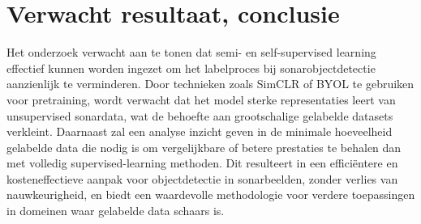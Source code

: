 
\section{Verwacht resultaat, conclusie}%
\label{sec:verwachte_resultaten}

Het onderzoek verwacht aan te tonen dat semi- en self-supervised learning effectief kunnen worden ingezet om het labelproces bij sonarobjectdetectie aanzienlijk te verminderen. Door technieken zoals SimCLR of BYOL te gebruiken voor pretraining, wordt verwacht dat het model sterke representaties leert van unsupervised sonardata, wat de behoefte aan grootschalige gelabelde datasets verkleint. Daarnaast zal een analyse inzicht geven in de minimale hoeveelheid gelabelde data die nodig is om vergelijkbare of betere prestaties te behalen dan met volledig supervised-learning methoden. Dit resulteert in een efficiëntere en kosteneffectieve aanpak voor objectdetectie in sonarbeelden, zonder verlies van nauwkeurigheid, en biedt een waardevolle methodologie voor verdere toepassingen in domeinen waar gelabelde data schaars is.
